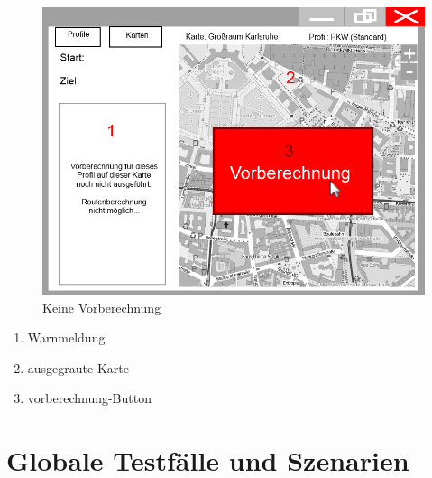 \documentclass[a4paper, 11pt]{article}
\begin{document}
\begin{figure}[ht]
\centering
\includegraphics[width=0.7\linewidth]{mockup_screenshot_nicht_berechnet}
\caption{Keine Vorberechnung}
\label{fig:mockupscreenshotkeinevorberechnung}
\end{figure}
\begin{enumerate}
\item Warnmeldung
\item ausgegraute Karte
\item \gls{vorberechnung}-Button
\end{enumerate}

\section{Globale Testfälle und Szenarien}
\end{document}
